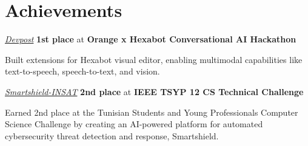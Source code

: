 \section{Achievements}

\begin{twocolentry}{
    \textit{\href{https://devpost.com/software/paranoid-android-submission}{Devpost}}}
    \textbf{1st place} at \textbf{Orange x Hexabot Conversational AI Hackathon}
\end{twocolentry}
\vspace{0.10 cm}
\begin{onecolentry}
    \begin{highlights}
        \item Built extensions for Hexabot visual editor, enabling multimodal capabilities like text-to-speech, speech-to-text, and vision.
    \end{highlights}
\end{onecolentry}
\entrygap

\begin{twocolentry}{
    \textit{\href{https://github.com/Smartshield-INSAT/}{Smartshield-INSAT}}}
    \textbf{2nd place} at \textbf{IEEE TSYP 12 CS Technical Challenge}
\end{twocolentry}
\vspace{0.10 cm}
\begin{onecolentry}
    \begin{highlights}
        \item Earned 2nd place at the Tunisian Students and Young Professionals Computer Science Challenge by creating an AI-powered platform for automated cybersecurity threat detection and response, Smartshield.
    \end{highlights}
\end{onecolentry}
